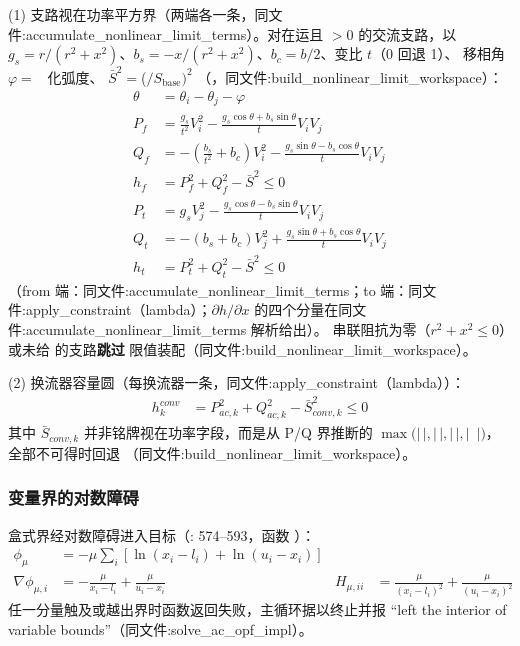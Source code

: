 (1) 支路视在功率平方界（两端各一条，同文件:accumulate\_nonlinear\_limit\_terms）。对在运且
$>0$ 的交流支路，以
$g_s=r/(r^{2}+x^{2})$、$b_s=-x/(r^{2}+x^{2})$、$b_c=b/2$、变比 $t$（0 回退 1）、
移相角 $\varphi=$~ 化弧度、
$\bar S^{2}=$($/S_{\mathrm{base}})^{2}$
（，同文件:build\_nonlinear\_limit\_workspace）：
\begin{align*}
\theta &= \theta_i-\theta_j-\varphi\\
P_f &= \frac{g_s}{t^{2}}V_i^{2} - \frac{g_s\cos\theta+b_s\sin\theta}{t}V_iV_j\\
Q_f &= -\left(\frac{b_s}{t^{2}}+b_c\right)V_i^{2}
       - \frac{g_s\sin\theta-b_s\cos\theta}{t}V_iV_j\\
h_f &= P_f^{2}+Q_f^{2}-\bar S^{2}\le 0\\
P_t &= g_sV_j^{2} - \frac{g_s\cos\theta-b_s\sin\theta}{t}V_iV_j\\
Q_t &= -(b_s+b_c)V_j^{2} + \frac{g_s\sin\theta+b_s\cos\theta}{t}V_iV_j\\
h_t &= P_t^{2}+Q_t^{2}-\bar S^{2}\le 0
\end{align*}
（from 端：同文件:accumulate\_nonlinear\_limit\_terms；to 端：同文件:apply\_constraint（lambda）；$\partial h/\partial x$
的四个分量在同文件:accumulate\_nonlinear\_limit\_terms 解析给出）。
串联阻抗为零（$r^{2}+x^{2}\le 0$）或未给  的支路\textbf{跳过}
限值装配（同文件:build\_nonlinear\_limit\_workspace）。

(2) 换流器容量圆（每换流器一条，同文件:apply\_constraint（lambda））：
\begin{align*}
h^{conv}_k &= P_{ac,k}^{2}+Q_{ac,k}^{2}-\bar S^{2}_{conv,k}\le 0
\end{align*}
其中 $\bar S_{conv,k}$ 并非铭牌视在功率字段，而是从 P/Q 界推断的
$\max(|\,$$|,|\,$$|,|\,$$|,|\,$
$|)$，全部不可得时回退 
（同文件:build\_nonlinear\_limit\_workspace）。

\subsubsection*{变量界的对数障碍}
盒式界经对数障碍进入目标（:
574--593，函数 ）：
\begin{align*}
\phi_{\mu} &= -\mu\sum_{i}\left[\ln(x_i-l_i)+\ln(u_i-x_i)\right]\\
\nabla\phi_{\mu,i} &= -\frac{\mu}{x_i-l_i}+\frac{\mu}{u_i-x_i} &
H_{\mu,ii} &= \frac{\mu}{(x_i-l_i)^{2}}+\frac{\mu}{(u_i-x_i)^{2}}
\end{align*}
任一分量触及或越出界时函数返回失败，主循环据以终止并报
``left the interior of variable bounds''（同文件:solve\_ac\_opf\_impl）。

